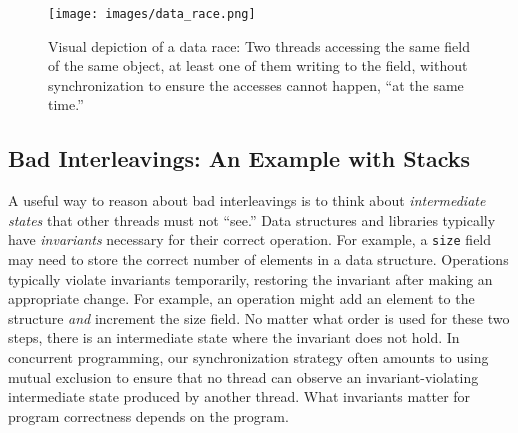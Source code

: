 \documentclass[10pt]{article}
\begin{document}
\begin{figure}
\begin{center}
\texttt{[image: images/data\_race.png]}
\end{center}
\caption{Visual depiction of a data race: Two threads accessing the
  same field of the same object, at least one of them writing to the
  field, without synchronization to ensure the accesses cannot happen,
  ``at the same time.''}
\label{fig:data_race}
\end{figure}

\subsection{Bad Interleavings: An Example with Stacks}
\label{sec:interleavings}

A useful way to reason about bad interleavings is to think about
\emph{intermediate states} that other threads must not ``see.''  Data
structures and libraries typically have \emph{invariants} necessary
for their correct operation.  For example, a {\tt size} field may need
to store the correct number of elements in a data structure.
Operations typically violate invariants temporarily, restoring the
invariant after making an appropriate change.  For example, an
operation might add an element to the structure \emph{and} increment
the size field.  No matter what order is used for these two steps,
there is an intermediate state where the invariant does not hold.  In
concurrent programming, our synchronization strategy often amounts to
using mutual exclusion to ensure that no thread can observe an
invariant-violating intermediate state produced by another thread.
What invariants matter for program correctness depends on the program.
\end{document}
